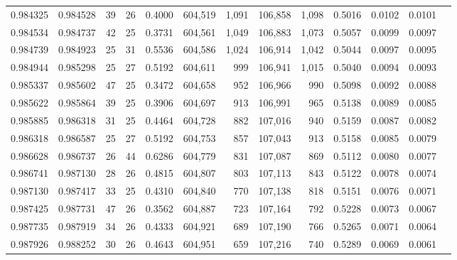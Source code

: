 \begin{tabular}{rrrrrrrrrrrrr}
0.984325 & 0.984528 &    39 &  26 &                                     0.4000 & 604,519 &   1,091 & 106,858 &   1,098 & 0.5016 & 0.0102 & 0.0101 \\
0.984534 & 0.984737 &    42 &  25 &                                     0.3731 & 604,561 &   1,049 & 106,883 &   1,073 & 0.5057 & 0.0099 & 0.0097 \\
0.984739 & 0.984923 &    25 &  31 &                                     0.5536 & 604,586 &   1,024 & 106,914 &   1,042 & 0.5044 & 0.0097 & 0.0095 \\
0.984944 & 0.985298 &    25 &  27 &                                     0.5192 & 604,611 &     999 & 106,941 &   1,015 & 0.5040 & 0.0094 & 0.0093 \\
0.985337 & 0.985602 &    47 &  25 &                                     0.3472 & 604,658 &     952 & 106,966 &     990 & 0.5098 & 0.0092 & 0.0088 \\
0.985622 & 0.985864 &    39 &  25 &                                     0.3906 & 604,697 &     913 & 106,991 &     965 & 0.5138 & 0.0089 & 0.0085 \\
0.985885 & 0.986318 &    31 &  25 &                                     0.4464 & 604,728 &     882 & 107,016 &     940 & 0.5159 & 0.0087 & 0.0082 \\
0.986318 & 0.986587 &    25 &  27 &                                     0.5192 & 604,753 &     857 & 107,043 &     913 & 0.5158 & 0.0085 & 0.0079 \\
0.986628 & 0.986737 &    26 &  44 &                                     0.6286 & 604,779 &     831 & 107,087 &     869 & 0.5112 & 0.0080 & 0.0077 \\
0.986741 & 0.987130 &    28 &  26 &                                     0.4815 & 604,807 &     803 & 107,113 &     843 & 0.5122 & 0.0078 & 0.0074 \\
0.987130 & 0.987417 &    33 &  25 &                                     0.4310 & 604,840 &     770 & 107,138 &     818 & 0.5151 & 0.0076 & 0.0071 \\
0.987425 & 0.987731 &    47 &  26 &                                     0.3562 & 604,887 &     723 & 107,164 &     792 & 0.5228 & 0.0073 & 0.0067 \\
0.987735 & 0.987919 &    34 &  26 &                                     0.4333 & 604,921 &     689 & 107,190 &     766 & 0.5265 & 0.0071 & 0.0064 \\
0.987926 & 0.988252 &    30 &  26 &                                     0.4643 & 604,951 &     659 & 107,216 &     740 & 0.5289 & 0.0069 & 0.0061 \\

\end{tabular}
